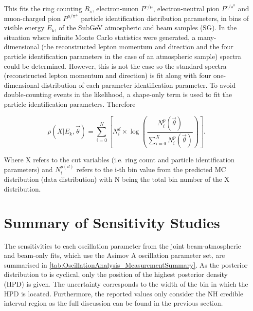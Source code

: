 This fits the ring counting $R_s$, electron-muon $P^{e/\mu}$, electron-neutral pion $P^{e/\pi^0}$ and muon-charged pion $P^{\mu/\pi^+}$ particle identification distribution parameters, in bins of visible energy $E_k$, of the SubGeV atmospheric and beam samples (SG). In the situation where infinite Monte Carlo statistics were generated, a many-dimensional (the reconstructed lepton momentum and direction and the four particle identification parameters in the case of an atmospheric sample) spectra could be determined. However, this is not the case so the standard spectra (reconstructed lepton momentum and direction) is fit along with four one-dimensional distribution of each parameter identification parameter. To avoid double-counting events in the likelihood, a shape-only term is used to fit the particle identification parameters. Therefore

\begin{equation}
\rho(X | E_k, \vec{\theta}) = \sum^{N}_{i = 0} \left[ N_i^d \times \log \left( \frac{N_i^p (\vec{\theta})}{\sum^{X}_{i = 0}N_i^p (\vec{\theta})} \right) \right].
\end{equation}

Where X refers to the cut variables (i.e. ring count and particle identification parameters) and $N_{i}^{p(d)}$ refers to the i-th bin value from the predicted MC distribution (data distribution) with N being the total bin number of the X distribution.
\fi

\clearpage
\section{Summary of Sensitivity Studies}
\label{sec:OA_Summary}

The sensitivities to each oscillation parameter from the joint beam-atmospheric and beam-only fits, which use the Asimov A oscillation parameter set, are summarised in \autoref{tab:OscillationAnalysis_MeasurementSummary}. As the posterior distribution to  is cyclical, only the position of the highest posterior density (HPD) is given. The uncertainty corresponds to the width of the bin in which the HPD is located. Furthermore, the  reported values only consider the NH credible interval region as the full discussion can be found in the previous section.

